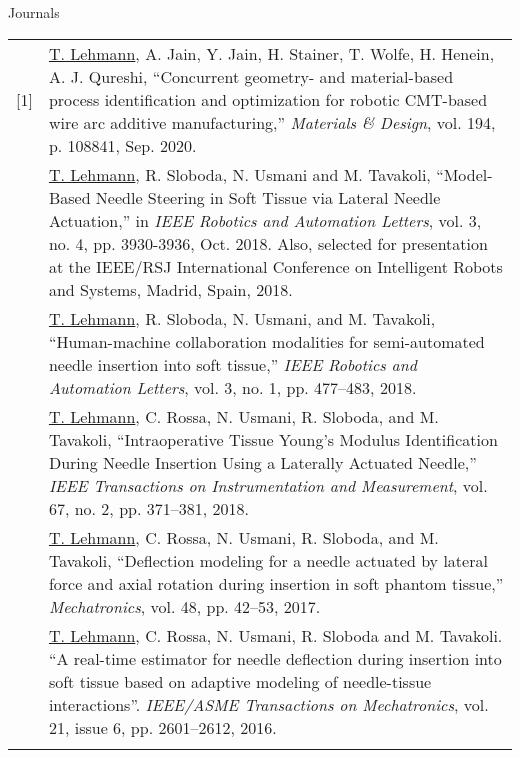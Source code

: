 

\begin{cventries}

  \cvpub
    {Journals}{
      \begin{tabular}{p{0.5cm} p{\textwidth - 0.5cm}}
        [1] & \underline{T. Lehmann}, A. Jain, Y. Jain, H. Stainer, T. Wolfe, H. Henein, A. J. Qureshi, ``Concurrent geometry- and material-based process identification and optimization for robotic CMT-based wire arc additive manufacturing,'' \emph{Materials \& Design}, vol. 194, p. 108841, Sep. 2020. \\\relax
        [2] & \underline{T. Lehmann}, R. Sloboda, N. Usmani and M. Tavakoli, ``Model-Based Needle Steering in Soft Tissue via Lateral Needle Actuation,'' in \emph{IEEE Robotics and Automation Letters}, vol. 3, no. 4, pp. 3930-3936, Oct. 2018. Also, selected for presentation at the IEEE/RSJ International Conference on Intelligent Robots and Systems, Madrid, Spain, 2018. \\\relax
        [3] & \underline{T. Lehmann}, R. Sloboda, N. Usmani, and M. Tavakoli, ``Human-machine collaboration modalities for semi-automated needle insertion into soft tissue,'' \emph{IEEE Robotics and Automation Letters}, vol. 3, no. 1, pp. 477–483, 2018. \\\relax
        [4] & \underline{T. Lehmann}, C. Rossa, N. Usmani, R. Sloboda, and M. Tavakoli, ``Intraoperative Tissue Young’s Modulus Identification During Needle Insertion Using a Laterally Actuated Needle,'' \emph{IEEE Transactions on Instrumentation and Measurement}, vol. 67, no. 2, pp. 371–381, 2018. \\\relax
        [5] & \underline{T. Lehmann}, C. Rossa, N. Usmani, R. Sloboda, and M. Tavakoli, ``Deflection modeling for a needle actuated by lateral force and axial rotation during insertion in soft phantom tissue,'' \emph{Mechatronics}, vol. 48, pp. 42–53, 2017. \\\relax
        [6] & \underline{T. Lehmann}, C. Rossa, N. Usmani, R. Sloboda and M. Tavakoli. ``A real-time estimator for needle deflection during insertion into soft tissue based on adaptive modeling of needle-tissue interactions''. \emph{IEEE/ASME Transactions on Mechatronics}, vol. 21, issue 6, pp. 2601--2612, 2016. \\\relax

\end{tabular}}
\end{cventries}
